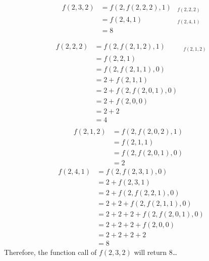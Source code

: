 \documentclass[12pt]{article}
\begin{document}
\begin{answer}
\begin{align*}
f(2,3,2) &= f(2, f(2, 2, 2), 1) &_{f(2,2,2)}\\
         &= f(2, 4, 1)  &_{f(2,4,1)}\\
         &= 8
\end{align*}

\begin{align*}
f(2,2,2) &= f(2, f(2,1,2), 1)  &_{f(2,1,2)}\\
         &= f(2,2,1)\\
         &= f(2, f(2,1,1),0) \\
         &= 2 + f(2,1,1) \\
         &= 2 + f(2, f(2,0,1), 0) \\
         &= 2 + f(2,0,0) \\
         &= 2+ 2 \\
         &= 4 \\
\end{align*}
\begin{align*}
f(2,1,2) &= f(2, f(2,0,2),1)  &\\
         &= f(2,1,1) \\
         &= f(2, f(2,0,1), 0) \\
         &= 2
\end{align*}
\begin{align*}
f(2,4,1) &= f(2, f(2,3,1), 0) \\
         &= 2 + f(2,3,1) \\
         &= 2 + f(2, f(2,2,1), 0) \\
         &= 2 + 2 + f(2, f(2,1,1), 0) \\
         &= 2 + 2 + 2 + f(2, f(2,0,1), 0) \\
         &= 2 + 2 + 2 + f(2,0,0) \\
         &= 2 + 2 + 2 + 2 \\
         &= 8
\end{align*}
Therefore, the function call of $f(2,3,2)$ will return $8$\dots
\end{answer}
\end{document}

